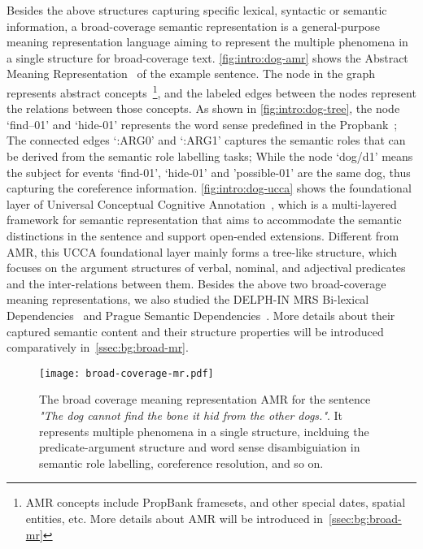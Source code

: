  Besides
the above structures capturing specific lexical, syntactic or semantic
information, a broad-coverage semantic representation is a
general-purpose meaning representation language aiming to represent
the multiple phenomena in a single structure for broad-coverage
text. \autoref{fig:intro:dog-amr} shows the Abstract Meaning
Representation~\citep[\textbf{AMR},][]{Ban:Bon:Cai:13} of the example
sentence. The node in the graph represents abstract
concepts~\footnote{AMR concepts include PropBank framesets, and other special dates, spatial entities, etc. More details about AMR will
  be introduced in~\autoref{ssec:bg:broad-mr}}, and the labeled edges
between the nodes represent the relations between those concepts. As
shown in \autoref{fig:intro:dog-tree}, the node `find–01' and
`hide-01' represents the word sense predefined in the
Propbank~\cite{Kin:Pal:02}; The connected edges `:ARG0' and `:ARG1'
captures the semantic roles that can be derived from the semantic role
labelling tasks; While the node `dog/d1' means the subject for events
`find-01', `hide-01' and 'possible-01' are the same dog, thus
capturing the coreference information. \autoref{fig:intro:dog-ucca}
shows the foundational layer of Universal Conceptual Cognitive
Annotation~\citep[\textbf{UCCA},][]{Abe:Rap:13b}, which is a
multi-layered framework for semantic representation that aims to
accommodate the semantic distinctions in the sentence and support
open-ended extensions. Different from AMR, this UCCA foundational
layer mainly forms a tree-like structure, which focuses on the argument
structures of verbal, nominal, and adjectival predicates and the
inter-relations between them. Besides the above two broad-coverage
meaning representations, we also studied the DELPH-IN MRS Bi-lexical
Dependencies~\cite[DM,][]{ivanova2012did} and Prague Semantic
Dependencies~\cite[PSD,][]{hajic2012announcing,miyao2014house}. More
details about their captured semantic content and their structure
properties will be introduced comparatively
in~\autoref{ssec:bg:broad-mr}.

\begin{figure}[!th]
\centering
\texttt{[image: broad-coverage-mr.pdf]}
\caption{\label{fig:intro:dog-amr} The broad coverage meaning
  representation AMR for the sentence \textit{"The dog cannot find the
    bone it hid from the other dogs."}. It represents multiple
  phenomena in a single structure, inclduing the predicate-argument
  structure and word sense disambiguiation in semantic role labelling,
  coreference resolution, and so on.}
\end{figure}


